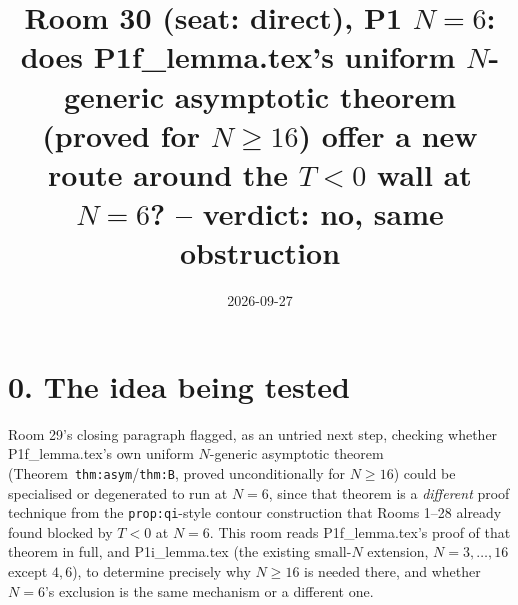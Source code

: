 \documentclass[11pt]{article}
\title{Room 30 (seat: direct), P1 $N=6$: does P1f\_lemma.tex's uniform $N$-generic asymptotic
theorem (proved for $N\ge16$) offer a new route around the $T<0$ wall at $N=6$? -- verdict: no,
same obstruction}
\date{2026-09-27}
\begin{document}
\maketitle

\section*{0. The idea being tested}
Room 29's closing paragraph flagged, as an untried next step, checking whether P1f\_lemma.tex's own
uniform $N$-generic asymptotic theorem (Theorem~\texttt{thm:asym}/\texttt{thm:B}, proved
unconditionally for $N\ge16$) could be specialised or degenerated to run at $N=6$, since that
theorem is a \emph{different} proof technique from the \texttt{prop:qi}-style contour construction
that Rooms 1--28 already found blocked by $T<0$ at $N=6$. This room reads P1f\_lemma.tex's proof of
that theorem in full, and P1i\_lemma.tex (the existing small-$N$ extension, $N=3,\ldots,16$ except
$4,6$), to determine precisely why $N\ge16$ is needed there, and whether $N=6$'s exclusion is the
same mechanism or a different one.
\end{document}
